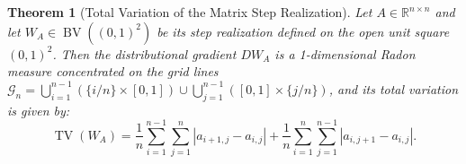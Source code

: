 \documentclass[11pt,a4paper,reqno]{amsart}
\newtheorem{theorem}{Theorem}[section]
\theoremstyle{definition}
\numberwithin{equation}{section}
\providecommand{\R}{\mathbb{R}}
\providecommand{\BV}{\operatorname{BV}}
\providecommand{\TV}{\operatorname{TV}}
\begin{document}
\begin{theorem}[Total Variation of the Matrix Step Realization]
\label{thm:tv_matrix}
Let $A \in \R^{n \times n}$ and let $W_A \in \BV((0,1)^2)$ be its step realization defined on the open unit square $(0, 1)^2$. Then the distributional gradient $D W_A$ is a 1-dimensional Radon measure concentrated on the grid lines $\mathcal{G}_n = \bigcup_{i=1}^{n-1} (\{i/n\} \times [0,1]) \cup \bigcup_{j=1}^{n-1} ([0,1] \times \{j/n\})$, and its total variation is given by:
\begin{equation}
    \label{eq:tv_formula}
    \TV(W_A) = \frac{1}{n} \sum_{i=1}^{n-1} \sum_{j=1}^n |a_{i+1, j} - a_{i, j}| + \frac{1}{n} \sum_{i=1}^n \sum_{j=1}^{n-1} |a_{i, j+1} - a_{i, j}|.
\end{equation}
\end{theorem}
\end{document}

